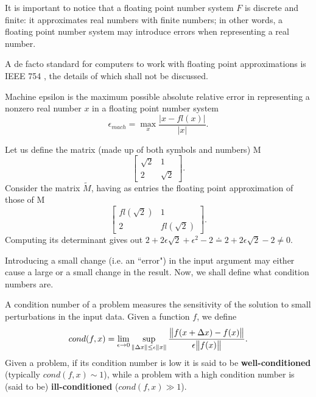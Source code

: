 It is important to notice that a floating point number system \(F\) is discrete and finite: it approximates real numbers with
finite numbers; in other words, a floating point number system may introduce errors when representing a real number.

A de facto standard for computers to work with floating point approximations is IEEE 754 \cite{ieeefp}, the details of which
shall not be discussed.

\begin{definition} \cite[p. 49]{numerical-mathematics}
    Machine epsilon is the maximum possible absolute relative error in representing a nonzero real number \(x\) in a
    floating point number system
    \[\epsilon_{mach} = \max \limits_{x} \dfrac{\vert x - fl(x) \vert}{\vert x \vert}.\]
\end{definition}

\begin{example}
    Let us define the matrix (made up of both symbols and numbers) M
    \[
        \begin{bmatrix}
            \sqrt{2}  &   1    \\
                2     & \sqrt{2}
        \end{bmatrix}.
    \]
    Consider the matrix \( \tilde{M} \), having as entries the floating point approximation of those of M
    \[
        \begin{bmatrix}
            fl(\sqrt{2})      &         1      \\
                2             &    fl(\sqrt{2})
        \end{bmatrix}.
    \]
    Computing its determinant gives out \( 2  +2\epsilon\sqrt{2} + \epsilon^2 - 2 \doteq 2 + 2\epsilon\sqrt{2} -2 \neq 0 \).
\end{example}

Introducing a small change (i.e. an ``error") in the input argument may either cause a large or a small change in the result.
Now, we shall define what condition numbers are.

\begin{definition}\cite[p. 33]{numerical-mathematics}
    A condition number of a problem measures the sensitivity of the solution to small perturbations in the input data.
    Given a function \(f \), we define
    \[
        cond(f, x) = \lim_{\epsilon \to 0} \sup \limits_{\norm{\Delta x} \leq \epsilon \norm{x}}
        \dfrac{\norm{f(x+\Delta x) - f(x)}}{\epsilon \norm{f(x)}}.
    \]
    Given a problem, if its condition number is low it is said to be \textbf{well-conditioned}
    (typically \( cond(f, x) \sim 1 \)), while a problem with a high condition number is (said to be)
    \textbf{ill-conditioned} (\( cond(f, x) \gg 1 \)).
\end{definition}

